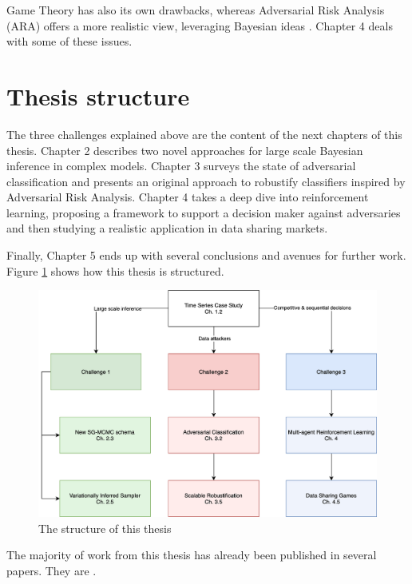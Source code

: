 Game Theory has also its own drawbacks, whereas Adversarial Risk Analysis (ARA) offers a more realistic view, leveraging Bayesian ideas \parencite{Banks}.
Chapter 4 deals with some of these issues.


\section{Thesis structure}

The three challenges explained above are the content of the next chapters of this thesis. Chapter 2 describes two novel approaches for large scale Bayesian inference in complex models. Chapter 3 surveys the state of adversarial classification and presents an original approach to robustify classifiers inspired by Adversarial Risk Analysis. Chapter 4 takes a deep dive into reinforcement learning, proposing a framework to support a decision maker against adversaries and then studying a realistic application in data sharing markets.

Finally, Chapter 5 ends up with several conclusions and avenues for further work. Figure \ref{fig:thesis} shows how this thesis is structured.


\begin{figure}[h]
\centering
\includegraphics[scale=0.8]{figures/thesis_structure.png}
\caption{The structure of this thesis}\label{fig:thesis}
\end{figure}

The majority of work from this thesis has already been published in several papers. They are \parencite{gallego2019dlms,angulo2018bayesian,gallego2019reinforcement,gallego2019opponent,gallego2021data,gallego2019vis,gallego2018stochastic,AMLARA,math8111957,gallego2020protecting}.